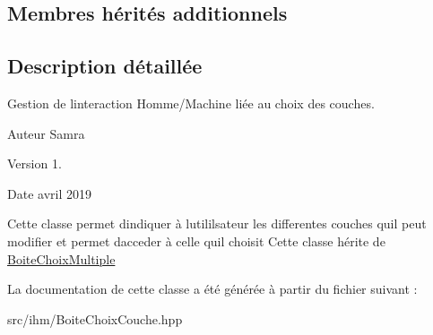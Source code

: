 \subsection*{Membres hérités additionnels}


\subsection{Description détaillée}
Gestion de l\textquotesingle{}interaction Homme/\+Machine liée au choix des couches. 

\begin{DoxyAuthor}{Auteur}
Samra 
\end{DoxyAuthor}
\begin{DoxyVersion}{Version}
1. 
\end{DoxyVersion}
\begin{DoxyDate}{Date}
avril 2019
\end{DoxyDate}
Cette classe permet d\textquotesingle{}indiquer à l\textquotesingle{}utililsateur les differentes couches qu\textquotesingle{}il peut modifier et permet d\textquotesingle{}acceder à celle qu\textquotesingle{}il choisit Cette classe hérite de \hyperlink{classBoiteChoixMultiple}{Boite\+Choix\+Multiple} 

La documentation de cette classe a été générée à partir du fichier suivant \+:\begin{DoxyCompactItemize}
\item 
src/ihm/Boite\+Choix\+Couche.\+hpp\end{DoxyCompactItemize}
